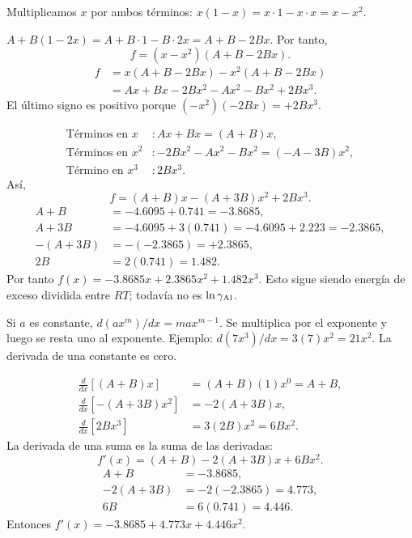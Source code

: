 Multiplicamos $x$ por ambos términos: $x(1-x)=x\cdot1-x\cdot x=x-x^2$.

$A+B(1-2x)=A+B\cdot1-B\cdot2x=A+B-2Bx$. Por tanto,
\[
f=(x-x^2)(A+B-2Bx).
\]
\begin{align*}
f&=x(A+B-2Bx)-x^2(A+B-2Bx)\\
&=Ax+Bx-2Bx^2-Ax^2-Bx^2+2Bx^3.
\end{align*}
El último signo es positivo porque $(-x^2)(-2Bx)=+2Bx^3$.

\begin{align*}
\text{Términos en }x &: Ax+Bx=(A+B)x,\\
\text{Términos en }x^2 &: -2Bx^2-Ax^2-Bx^2=(-A-3B)x^2,\\
\text{Término en }x^3 &: 2Bx^3.
\end{align*}
Así,
\[
f=(A+B)x-(A+3B)x^2+2Bx^3.
\]
\begin{align*}
A+B&=-4.6095+0.741=-3.8685,\\
A+3B&=-4.6095+3(0.741)=-4.6095+2.223=-2.3865,\\
-(A+3B)&=-(-2.3865)=+2.3865,\\
2B&=2(0.741)=1.482.
\end{align*}
Por tanto $f(x)=-3.8685x+2.3865x^2+1.482x^3$. Esto sigue siendo energía de exceso dividida entre $RT$; todavía no es $\ln\gamma_{\mathrm{Al}}$.

Si $a$ es constante, $d(ax^m)/dx=ma x^{m-1}$. Se multiplica por el exponente y luego se resta uno al exponente. Ejemplo: $d(7x^3)/dx=3(7)x^2=21x^2$. La derivada de una constante es cero.

\begin{align*}
\frac{d}{dx}[(A+B)x]&=(A+B)(1)x^0=A+B,\\
\frac{d}{dx}[-(A+3B)x^2]&=-2(A+3B)x,\\
\frac{d}{dx}[2Bx^3]&=3(2B)x^2=6Bx^2.
\end{align*}
La derivada de una suma es la suma de las derivadas:
\[
f'(x)=(A+B)-2(A+3B)x+6Bx^2.
\]
\begin{align*}
A+B&=-3.8685,\\
-2(A+3B)&=-2(-2.3865)=4.773,\\
6B&=6(0.741)=4.446.
\end{align*}
Entonces $f'(x)=-3.8685+4.773x+4.446x^2$.

